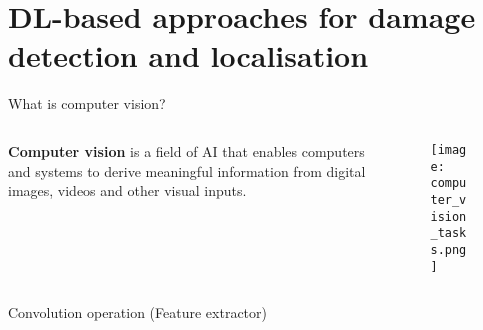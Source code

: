 \documentclass[10pt,aspectratio=169,dvipsnames]{beamer} %
\begin{document}
	
	\section{DL-based approaches for damage detection and localisation}
	\setcounter{subfigure}{0}
	\begin{frame}{What is computer vision?}
		\begin{columns}[T]
			\begin{column}[c]{0.30\textwidth}
				\justifying
				\alert {\textbf{Computer vision}} is a field of AI that enables computers and systems to derive meaningful information from digital images, videos and other visual inputs. 
			\end{column}
			\hfill
			\begin{column}[c]{0.65\textwidth}
				\begin{figure}
					\centering
					\texttt{[image: computer\_vision\_tasks.png]}
				\end{figure}
			\end{column}
		\end{columns}
	\end{frame}
	\begin{frame}{Convolution operation (Feature extractor)}
		\begin{figure}[t]
			\centering
		\end{figure}
	\end{frame}
\end{document}
